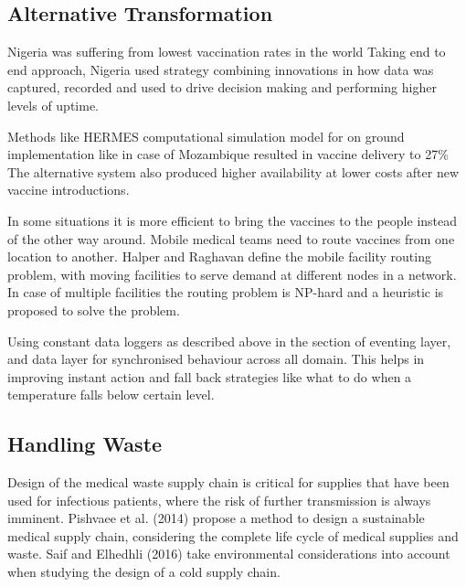 \documentclass{article}
\begin{document}
 \subsection{Alternative Transformation}
 Nigeria was suffering from lowest vaccination rates in the world Taking end to end approach, Nigeria used strategy combining innovations in how data was captured, recorded and used to drive decision making and performing higher levels of uptime.\cite{sarley2017transforming}
 
 Methods like HERMES computational simulation model for on ground implementation like in case of Mozambique resulted in vaccine delivery to 27\% The alternative system also produced higher availability at lower costs after new vaccine introductions.\cite{LEE20164998}
 
 In some situations it is more efficient to bring the vaccines to the people instead of the other way around. Mobile medical teams need to route vaccines from one location to another. Halper and Raghavan define the mobile facility routing problem, with moving facilities to serve demand at different nodes in a network. In case of multiple facilities the routing problem is NP-hard and a heuristic is proposed to solve the problem.\cite{duijzer2018literature}
 
 Using constant data loggers as described above in the section of eventing layer, and data layer for synchronised behaviour across all domain. This helps in improving instant action and fall back strategies like what to do when a temperature falls below certain level.
 
 \subsection{Handling Waste}
 
 Design of the medical waste supply chain is critical for supplies that have been used for infectious patients, where the risk of further transmission is always imminent. Pishvaee et al. (2014) propose a method to design a sustainable medical supply chain, considering the complete life cycle of medical supplies and waste. Saif and Elhedhli (2016) take environmental considerations into account when studying the design of a cold supply chain. \cite{duijzer2018literature}
 
\end{document}
